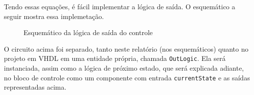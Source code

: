 \documentclass[a4paper,12pt]{article}
\newcommand{\cod}[1]{\texttt{#1}}
\begin{document}
\noindent Tendo essas equações, é fácil implementar a lógica de saída. O esquemático a seguir mostra essa implemetação.

\begin{figure}[H]
    \centering
    
    \vspace{-25pt}
    \caption{Esquemático da lógica de saída do controle}
    \vspace{-10pt}
\end{figure}

O circuito acima foi separado, tanto neste relatório (nos esquemáticos) quanto no projeto em VHDL em uma entidade própria, chamada \cod{OutLogic}. Ela será instanciada, assim como a lógica de próximo estado, que será explicada adiante, no bloco de controle como um componente com entrada \cod{currentState} e as saídas representadas acima.
\end{document}
